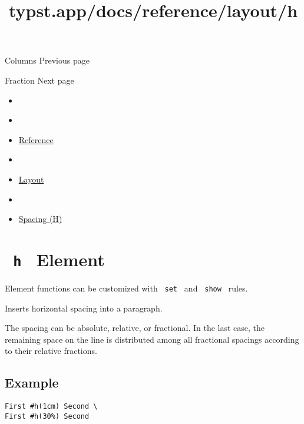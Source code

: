 \href{/docs/reference/layout/columns/}{\pandocbounded{}}

{ Columns } { Previous page }

\href{/docs/reference/layout/fraction/}{\pandocbounded{}}

{ Fraction } { Next page }


\title{typst.app/docs/reference/layout/h}

\begin{itemize}
\tightlist
\item
  \href{/docs}{}
\item
  
\item
  \href{/docs/reference/}{Reference}
\item
  
\item
  \href{/docs/reference/layout/}{Layout}
\item
  
\item
  \href{/docs/reference/layout/h/}{Spacing (H)}
\end{itemize}

\section{\texorpdfstring{\texttt{\ h\ } {{ Element
}}}{ h   Element }}\label{summary}

\label{element-tooltip}
Element functions can be customized with \texttt{\ set\ } and
\texttt{\ show\ } rules.

Inserts horizontal spacing into a paragraph.

The spacing can be absolute, relative, or fractional. In the last case,
the remaining space on the line is distributed among all fractional
spacings according to their relative fractions.

\subsection{Example}\label{example}

\begin{verbatim}
First #h(1cm) Second \
First #h(30%) Second
\end{verbatim}

